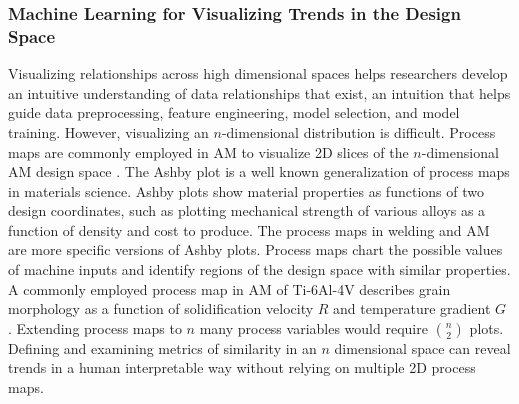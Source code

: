 \subsubsection{Machine Learning for Visualizing Trends in the Design Space}\label{viz}

Visualizing relationships across high dimensional spaces helps researchers develop an intuitive understanding of data relationships that exist, an intuition that helps guide data preprocessing, feature engineering, model selection, and model training. However, visualizing an $n$-dimensional distribution is difficult. Process maps are commonly employed in AM to visualize 2D slices of the $n$-dimensional AM design space \cite{Beuth2001}. The Ashby plot is a well known generalization of process maps in materials science. Ashby plots show material properties as functions of two design coordinates, such as plotting mechanical strength of various alloys as a function of density and cost to produce. The process maps in welding and AM are more specific versions of Ashby plots. Process maps chart the possible values of machine inputs and identify regions of the design space with similar properties. A commonly employed process map in AM of Ti-6Al-4V describes grain morphology as a function of solidification velocity $R$ and temperature gradient $G$ \cite{DeHoff2015}. Extending process maps to $n$ many process variables would require ${n \choose 2}$ plots. Defining and examining metrics of similarity in an $n$ dimensional space can reveal trends in a human interpretable way without relying on multiple 2D process maps. 


